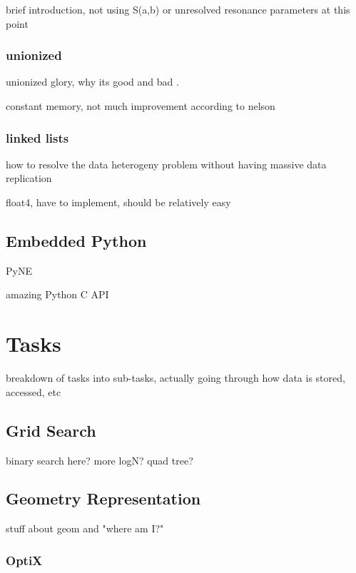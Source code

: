 brief introduction, not using S(a,b) or unresolved resonance parameters at this point

\subsubsection{unionized}

unionized glory, why its good and bad \cite{jaakko}.

constant memory, not much improvement according to nelson

\subsubsection{linked lists}

how to resolve the data heterogeny problem without having massive data replication

float4, have to implement, should be relatively easy

\subsection{Embedded Python}

PyNE

amazing Python C API



\section{Tasks}

breakdown of tasks into sub-tasks, actually going through how data is stored, accessed, etc

\subsection{Grid Search}

binary search here? more logN?  quad tree?

\subsection{Geometry Representation}

stuff about geom and "where am I?"

\subsubsection{OptiX}

